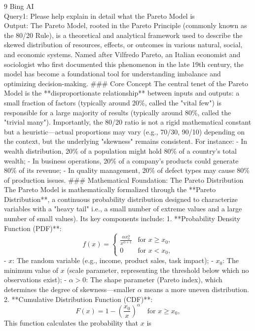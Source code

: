 \AImatter

\begin{ReportAiUse}{9}
Bing AI\\
Query1: Please help explain in detail what the Pareto Model is\\
Output: The Pareto Model, rooted in the Pareto Principle (commonly known as the 80/20 Rule), is a theoretical and 
analytical framework used to describe the skewed distribution of resources, effects, or outcomes in various natural, 
social, and economic systems. Named after Vilfredo Pareto, an Italian economist and sociologist who first documented 
this phenomenon in the late 19th century, the model has become a foundational tool for understanding imbalance and 
optimizing decision-making.
 ### Core Concept The central tenet of the Pareto Model is the **disproportionate relationship** 
between inputs and outputs: a small fraction of factors (typically around 20\%, called the "vital few") 
is responsible for a large majority of results (typically around 80\%, called the "trivial many"). 
Importantly, the 80/20 ratio is not a rigid mathematical constant but a heuristic—actual proportions may vary 
(e.g., 70/30, 90/10) depending on the context, but the underlying "skewness" remains consistent. For instance: 
- In wealth distribution, 20\% of a population might hold 80\% of a country’s total wealth; 
- In business operations, 20\% of a company’s products could generate 80\% of its revenue; 
- In quality management, 20\% of defect types may cause 80\% of production issues. 
### Mathematical Foundation: The Pareto Distribution The Pareto Model is mathematically formalized through 
the **Pareto Distribution**, a continuous probability distribution designed to characterize variables with a "heavy tail" 
i.e., a small number of extreme values and a large number of small values). 
Its key components include: 
1. **Probability Density Function (PDF)**: \[ f(x) = \begin{cases} \frac{\alpha x_0^\alpha}{x^{\alpha + 1}} & \text{for } x \geq x_0, \\ 0 & \text{for } x < x_0, \end{cases} \] - \( x \): 
The random variable (e.g., income, product sales, task impact);
 - \( x_0 \): The minimum value of \( x \) (scale parameter, representing the threshold below which no observations exist);
 - \( \alpha > 0 \): The shape parameter (Pareto index), which determines the degree of skewness—smaller \( \alpha \) means a more uneven distribution. 
2. **Cumulative Distribution Function (CDF)**: \[ F(x) = 1 - \left( \frac{x_0}{x} \right)^\alpha \quad \text{for } x \geq x_0, \] This function calculates the probability that \( x \) is 

\end{ReportAiUse}
